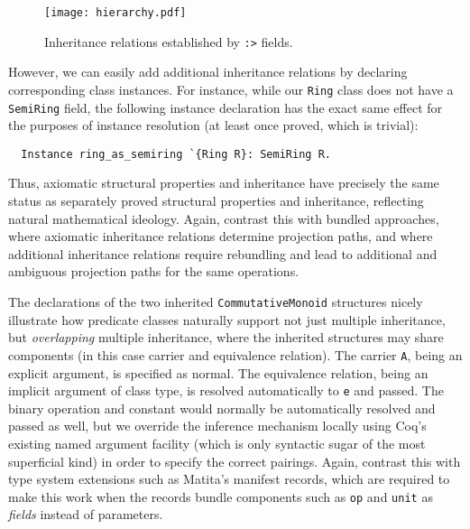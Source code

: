\documentclass[a4paper,10pt,runningheads]{llncs}
\begin{document}
\begin{figure}
\centering
\texttt{[image: hierarchy.pdf]}
\caption{Inheritance relations established by \lstinline|:>| fields.}
\label{inheritancediagram}
\end{figure}


However, we can easily add additional inheritance relations by declaring corresponding class instances. For instance, while our \lstinline|Ring| class does not have a \lstinline|SemiRing| field, the following instance declaration has the exact same effect for the purposes of instance resolution (at least once proved, which is trivial):
\begin{lstlisting}
  Instance ring_as_semiring `{Ring R}: SemiRing R.
\end{lstlisting}

Thus, axiomatic structural properties and inheritance have precisely the same status as separately proved structural properties and inheritance, reflecting natural mathematical ideology. Again, contrast this with bundled approaches, where axiomatic inheritance relations determine projection paths, and where additional inheritance relations require rebundling and lead to additional and ambiguous projection paths for the same operations.


The declarations of the two inherited \lstinline|CommutativeMonoid| structures nicely illustrate how predicate classes naturally support not just multiple inheritance, but \emph{overlapping} multiple inheritance, where the inherited structures may share components (in this case carrier and equivalence relation). The carrier \lstinline|A|, being an explicit argument, is specified as normal. The equivalence relation, being an implicit argument of class type, is resolved automatically to \lstinline|e| and passed. The binary operation and constant would normally be automatically resolved and passed as well, but we override the inference mechanism locally using Coq's existing named argument facility (which is only syntactic sugar of the most superficial kind) in order to specify the correct pairings. 
Again, contrast this with type system extensions such as Matita's manifest records, which are required to make this work when the records bundle components such as \lstinline|op| and \lstinline{unit} as \emph{fields} instead of parameters.
\end{document}

